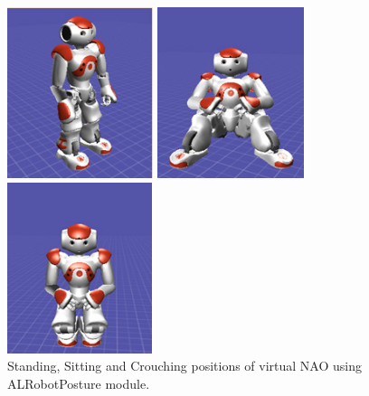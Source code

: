 \begin{figure}
	\centering 
	\begin{minipage}
		{.3 
		\textwidth} \centering 
		\includegraphics[height=5cm]{figures/content/nao-stand.jpg} 
	\end{minipage}
	\begin{minipage}
		{.3 
		\textwidth} \centering 
		\includegraphics[height=5cm]{figures/content/nao-sit.jpg} 
	\end{minipage}
	\begin{minipage}
		{.3 
		\textwidth} \centering 
		\includegraphics[height=5cm]{figures/content/nao-crouch.jpg} 
	\end{minipage}
	\caption{Standing, Sitting and Crouching positions of virtual NAO using ALRobotPosture module. \cite{8}} \label{fg:nao:motion} 
\end{figure}
